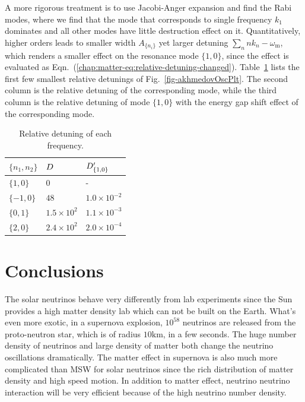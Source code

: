 A more rigorous treatment is to use Jacobi-Anger expansion and find the Rabi modes, where we find that the mode that corresponds to single frequency $k_1$ dominates and all other modes have little destruction effect on it. Quantitatively, higher orders leads to smaller width $A_{\{n_i\}}$ yet larger detuning $\sum_{n} nk_n-\omega_{\mathrm m}$, which renders a smaller effect on the resonance mode $\{1,0\}$, since the effect is evaluated as Eqn.~(\ref{chap:matter-eq:relative-detuning-changed}).
Table~\ref{tab-q-values-each-mode} lists the first few smallest relative detunings of Fig.~\ref{fig-akhmedovOscPlt}. The second column is the relative detuning of the corresponding mode, while the third column is the relative detuning of mode $\{1,0\}$ with the energy gap shift effect of the corresponding mode.




\begin{table}
\centering

\begin{tabular}{lll}
\hline
 $\{n_1,n_2\}$ &  $D$ & $D'_{\{1,0\}}$   \\
\hline
 $\{1,0\}$ & $0$ &  - \\
 $\{-1,0\}$ & $48$ &  $1.0\times 10^{-2}$ \\
 $\{0,1\}$ & $1.5\times 10^2$ &  $1.1\times 10^{-3}$  \\
 $\{2,0\}$ & $2.4\times 10^{2}$ & $2.0\times 10^{-4}$ \\
 \hline
\end{tabular}
\caption{\label{tab-q-values-each-mode}Relative detuning of each frequency.}
\end{table}






\section{\label{conclusions}Conclusions}



The solar neutrinos behave very differently from lab experiments since the Sun provides a high matter density lab which can not be built on the Earth. What's even more exotic, in a supernova explosion, $10^{58}$ neutrinos are released from the proto-neutron star, which is of radius $10\mathrm{km}$, in a few seconds. The huge number density of neutrinos and large density of matter both change the neutrino oscillations dramatically. The matter effect in supernova is also much more complicated than MSW for solar neutrinos since the rich distribution of matter density and high speed motion. In addition to matter effect, neutrino neutrino interaction will be very efficient because of the high neutrino number density.

